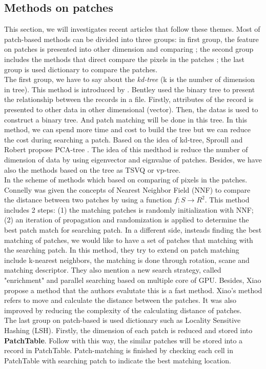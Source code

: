 \subsection{Methods on patches}
This section, we will investigates recent articles that follow these themes. Most of patch-based methods can be divided into three groups: in first group, the feature on patches is presented into other dimension and comparing \cite{bentley1975multidimensional, sproull1991refinements, niyogi1996example, kumar2008good}; the second group includes the methods that direct compare the pixels in the patches \cite{barnes2010generalized, barnes2009patchmatch, xiao2011fast}; the last group is used dictionary to compare the patches\cite{datar2004locality}.\\[0.2cm]
The first group, we have to say about the \textit{kd-tree} (k is the number of dimension in tree). This method is introduced by \cite{bentley1975multidimensional}. Bentley used the binary tree to present the relationship between the records in a file. Firstly, attributes of the record is presented to other data in other dimensional (vector). Then, the datas is used to construct a binary tree. And patch matching will be done in this tree. In this method, we can spend more time and cost to build the tree but we can reduce the cost during searching a patch. Based on the idea of kd-tree, Sproull and Robert propose PCA-tree \cite{sproull1991refinements}. The idea of this medthod is reduce the number of dimension of data by using eigenvector and eignvalue of patches. Besides, we have also the methods based on the tree as TSVQ \cite{niyogi1996example} or vp-tree\cite{kumar2008good}.\\[0.2cm]
In the scheme of methods which based on comparing of pixels in the patches. Connelly\cite{barnes2009patchmatch} was given the concepts of Nearest Neighbor Field (NNF) to compare the distance between two patches by using a function $f: S \rightarrow R^2$. This method includes 2 steps: (1) the matching patches is randomly initialization with NNF; (2) an iteration of propagation and randomization is applied to determine the best patch match for searching patch. In a different side, insteads finding the best matching of patches, we would like to have a set of patches that matching with the searching patch\cite{barnes2010generalized}. In this method, they try to extend on patch matching include k-nearest neighbors, the matching is done through rotation, scane and matching descriptor. They also mention a new search strategy, called "enrichment" and parallel searching based on multiple core of GPU. Besides, Xiao\cite{xiao2011fast} propose a method that the authors evalutate this is a fast method. Xiao's method refers to move and calculate the distance between the patches. It was also improved by reducing the complexity of the calculating distance of patches.\\[0.2cm]
The last group on patch-based is used dictionary such as Locality Sensitive Hashing (LSH)\cite{datar2004locality}. Firstly, the dimension of each patch is reduced and stored into \textbf{PatchTable}. Follow with this way, the similar patches will be stored into a record in PatchTable. Patch-matching is finished by checking each cell in PatchTable with searching patch to indicate the best matching location.
